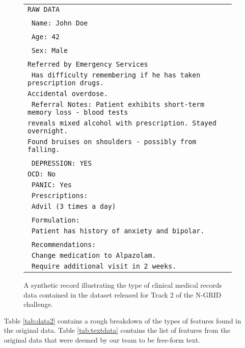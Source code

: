 \begin{figure}[t]
\begin{tabular}{|l|}
\hline
\texttt{RAW DATA}\\
     \\
\texttt{    Name: John Doe}\\
\\    
  \texttt{  Age: 42}\\
\\
\texttt{    Sex: Male}\\
\\    
    \texttt{Referred by Emergency Services}
\\    
\texttt{    Has difficulty remembering if he has taken prescription drugs.}\\ \texttt{Accidental overdose.}
\\    
\texttt{    Referral Notes: Patient exhibits short-term memory loss - blood tests}\\
\texttt{reveals mixed alcohol with
    prescription. Stayed overnight.}\\
\texttt{Found bruises on shoulders - possibly from falling.}\\
\\   
  \texttt{  DEPRESSION: YES}
  \\
\texttt{OCD: No}
\\
\texttt{    PANIC: Yes}
\\    
\texttt{    Prescriptions:}\\
\texttt{         Advil (3 times a day)}\\
\\         
\texttt{    Formulation:}
\\
\texttt{    Patient has history of anxiety and bipolar.}\\
\\    
\texttt{    Recommendations:}
\\
\texttt{    Change medication to Alpazolam.}
\\
\texttt{    Require additional visit in 2 weeks.}
\\    
\hline
\end{tabular}
\caption{A synthetic record illustrating the type of clinical medical records data contained in the
dataset released for Track 2 of the N-GRID challenge.}
\label{fig:sampleRecord}
\end{figure}

Table \ref{tab:data2} contains a rough breakdown of the types of features found in the original data. 
Table
\ref{tab:textdata} contains the list of features from the original data that 
were deemed by our team to be free-form text.


